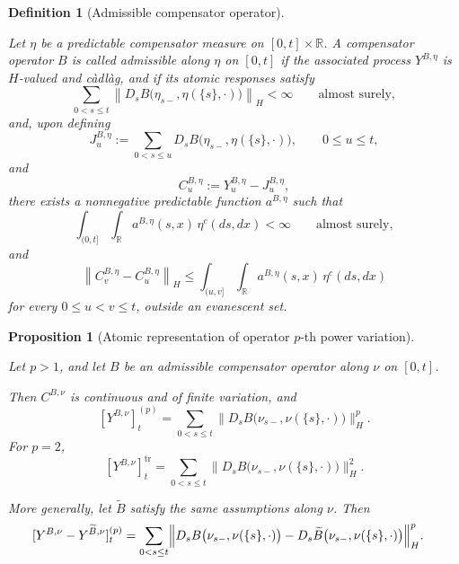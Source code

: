 \documentclass[a4paper,10pt]{article}
\newtheorem{prop}[thm]{Proposition}
\newtheorem{defin}[thm]{Definition}
\begin{document}
\begin{defin}[Admissible compensator operator]
\label{defin:admissible-compensator-operator}

Let \(\eta\) be a predictable compensator measure on
\([0,t]\times\mathbb R\). A compensator operator \(B\) is called admissible along \(\eta\) on
\([0,t]\) if the associated process \(Y^{B,\eta}\) is \(H\)-valued and
càdlàg, and if its atomic responses satisfy
\[
\sum_{0<s\le t}
\left\lVert
D_sB\bigl(
        \eta_{s-},
        \eta(\{s\},\cdot)
\bigr)
\right\rVert_H
<
\infty
\qquad\text{almost surely},
\]
and, upon defining
\[
J_u^{B,\eta}
:=
\sum_{0<s\le u}
D_sB\bigl(
        \eta_{s-},
        \eta(\{s\},\cdot)
\bigr),
\qquad 0\le u\le t,
\]
and
\[
C_u^{B,\eta}
:=
Y_u^{B,\eta}-J_u^{B,\eta},
\]
there exists a nonnegative predictable function \(a^{B,\eta}\) such
that
\[
\int_{(0,t]}\int_{\mathbb R}
a^{B,\eta}(s,x)\,\eta^c(ds,dx)
<
\infty
\qquad\text{almost surely},
\]
and
\[
\left\lVert
C_v^{B,\eta}-C_u^{B,\eta}
\right\rVert_H
\le
\int_{(u,v]}\int_{\mathbb R}
a^{B,\eta}(s,x)\,\eta^c(ds,dx)
\]
for every \(0\le u<v\le t\), outside an evanescent set.
\end{defin}

\begin{prop}[Atomic representation of operator \(p\)-th power variation]
\label{prop:atomic-operator-p-variation}

Let \(p>1\), and let \(B\) be an admissible compensator operator along
\(\nu\) on \([0,t]\).

Then \(C^{B,\nu}\) is continuous and of finite variation, and
\[
[Y^{B,\nu}]^{(p)}_t
=
\sum_{0<s\le t}
\lVert
D_sB\bigl(\nu_{s-},\nu(\{s\},\cdot)\bigr)
\rVert_H^p.
\]
For \(p=2\),
\[
[Y^{B,\nu}]^{\operatorname{tr}}_t
=
\sum_{0<s\le t}
\lVert
D_sB\bigl(\nu_{s-},\nu(\{s\},\cdot)\bigr)
\rVert_H^2.
\]

More generally, let \(\widetilde B\) satisfy the same assumptions along
\(\nu\). Then
\[
\begin{aligned}
&[Y^{B,\nu}-Y^{\widetilde B,\nu}]^{(p)}_t
=
\sum_{0<s\le t}
\Bigl\lVert
D_sB\bigl(\nu_{s-},\nu(\{s\},\cdot)\bigr)
-
D_s\widetilde B
\bigl(\nu_{s-},\nu(\{s\},\cdot)\bigr)
\Bigr\rVert_H^p.
\end{aligned}
\]
\end{prop}
\end{document}

